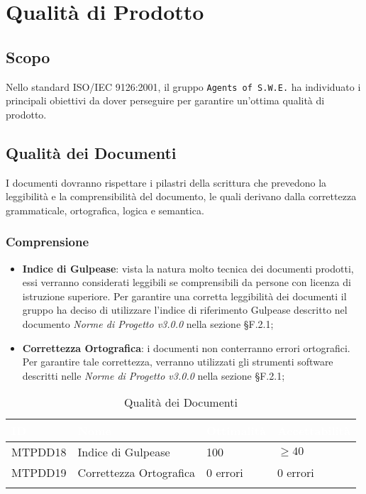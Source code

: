 \section{Qualità di Prodotto}
\label{qualitaProdotto}

\subsection{Scopo}

Nello standard ISO/IEC 9126:2001, il gruppo \texttt{Agents of S.W.E.} ha individuato i principali obiettivi da dover perseguire per garantire un'ottima qualità di prodotto.  

\subsection{Qualità dei Documenti}

I documenti dovranno rispettare i pilastri della scrittura che prevedono la leggibilità e la comprensibilità del documento, le quali derivano dalla correttezza grammaticale, ortografica, logica e semantica.

\subsubsection{Comprensione}

\begin{itemize}
	\item \textbf{Indice di Gulpease}: vista la natura molto tecnica dei documenti prodotti, essi verranno considerati leggibili se comprensibili da persone con licenza di istruzione superiore. Per garantire una corretta leggibilità dei documenti il gruppo ha deciso di utilizzare l'indice di riferimento Gulpease descritto nel documento \textit{Norme di Progetto v3.0.0} nella sezione §F.2.1;
	
	\item \textbf{Correttezza Ortografica}: i documenti non conterranno errori ortografici. Per garantire tale correttezza, verranno utilizzati gli strumenti software descritti nelle \textit{Norme di Progetto v3.0.0} nella sezione §F.2.1;
	
\end{itemize}

\begin{longtable}{|C{.15\textwidth}|C{.24\textwidth}|C{.24\textwidth}|C{.24\textwidth}|}
\hline
{}\textbf{\textcolor{white}{ID}} & \textbf{\textcolor{white}{Nome}} & \textbf{\textcolor{white}{Ottimalità}} & \textbf{\textcolor{white}{Accettabilità}}\\
\hline
MTPDD18 & Indice di Gulpease & 100 & $\geq 40$ \\
\hline
{}MTPDD19 & Correttezza Ortografica & 0 errori & 0 errori \\ 
\hline
\caption{Qualità dei Documenti}
\label{QualitàDocumenti}
\end{longtable}


